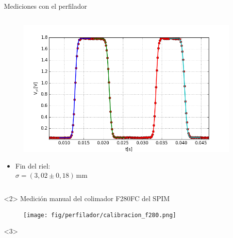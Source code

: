 \begin{frame}{Mediciones con el perfilador}
\begin{onlyenv}
\begin{columns}[t]
            \begin{column}{0.5\textwidth}
                \vspace{-2em}
                \begin{figure}[H]
                    \centering
                    \includegraphics[width=\textwidth]{fig/perfilador/spim_foco_zoom.png}
                    \label{fig:spim_foco_zoom}
                \end{figure}
                \vspace{1em}
                \begin{itemize}
                    \item Fin del riel:\\ $\sigma = (3,02 \pm 0,18)\,\text{mm}$
                \end{itemize}
                
            \end{column}
            
        \end{columns}
        
       
    \end{onlyenv}
    
    \begin{onlyenv}<2>
        Medición manual del colimador F280FC del SPIM
            \begin{figure}[H]
                \centering
                \texttt{[image: fig/perfilador/calibracion\_f280.png]}
                \label{fig:perfilador/calibracion_f280}
            \end{figure}

        
    \end{onlyenv}


    \begin{onlyenv}<3>


\end{onlyenv}
\end{frame}
